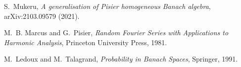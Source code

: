 \documentclass[11pt]{article}
\begin{document}
\medskip
{}\par\smallskip
\noindent[1] S.~Mukeru, \emph{A generalisation of Pisier homogeneous Banach
algebra}, arXiv:2103.09579 (2021).\par
\noindent[2] M.~B. Marcus and G.~Pisier, \emph{Random Fourier Series with
Applications to Harmonic Analysis}, Princeton University Press, 1981.\par
\noindent[3] M.~Ledoux and M.~Talagrand, \emph{Probability in Banach Spaces},
Springer, 1991.
\end{document}
